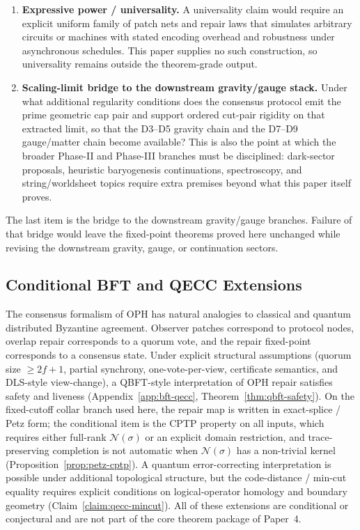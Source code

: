 \documentclass[11pt]{article}
\theoremstyle{remark}
\theoremstyle{plain}
\begin{document}
\begin{enumerate}
\item \textbf{Expressive power / universality.} A universality claim would require an explicit uniform family of patch nets and repair laws that simulates arbitrary circuits or machines with stated encoding overhead and robustness under asynchronous schedules. This paper supplies no such construction, so universality remains outside the theorem-grade output.

\item \textbf{Scaling-limit bridge to the downstream gravity/gauge stack.} Under what additional regularity conditions does the consensus protocol emit the prime geometric cap pair and support ordered cut-pair rigidity on that extracted limit, so that the D3--D5 gravity chain and the D7--D9 gauge/matter chain become available? This is also the point at which the broader Phase-II and Phase-III branches must be disciplined: dark-sector proposals, heuristic baryogenesis continuations, spectroscopy, and string/worldsheet topics require extra premises beyond what this paper itself proves.
\end{enumerate}

The last item is the bridge to the downstream gravity/gauge branches. Failure of that bridge would
leave the fixed-point theorems proved here unchanged while revising the downstream gravity, gauge,
or continuation sectors.

\subsection{Conditional BFT and QECC Extensions}
\label{subsec:conditional-bft-qecc}

The consensus formalism of \textrm{OPH} has natural analogies to classical and quantum
distributed Byzantine agreement. Observer patches correspond to protocol nodes, overlap repair
corresponds to a quorum vote, and the repair fixed-point corresponds to a consensus state. Under
explicit structural assumptions (quorum size $\geq 2f+1$, partial synchrony, one-vote-per-view,
certificate semantics, and \textrm{DLS}-style view-change), a \textrm{QBFT}-style interpretation
of \textrm{OPH} repair satisfies safety and liveness (Appendix~\ref{app:bft-qecc},
Theorem~\ref{thm:qbft-safety}). On the fixed-cutoff collar branch used here, the repair map is
written in exact-splice / Petz form; the conditional item is the \textrm{CPTP}
property on all inputs, which requires either full-rank $\mathcal{N}(\sigma)$ or an explicit
domain restriction, and trace-preserving completion is not automatic when
$\mathcal{N}(\sigma)$ has a non-trivial kernel
(Proposition~\ref{prop:petz-cptp}). A quantum error-correcting interpretation is possible under
additional topological structure, but the code-distance / min-cut equality requires explicit
conditions on logical-operator homology and boundary geometry (Claim~\ref{claim:qecc-mincut}). All
of these extensions are conditional or conjectural and are not part of the core theorem package of
Paper~4.
\end{document}
